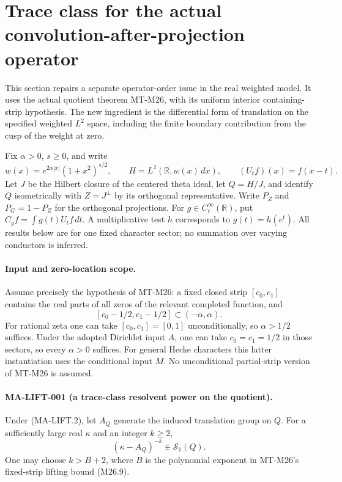 \section{Trace class for the actual convolution-after-projection operator}
\label{sec:actual-lift-trace}

This section repairs a separate operator-order issue in the real
weighted model. It uses the actual quotient theorem MT-M26, with
its uniform interior containing-strip hypothesis. The new ingredient
is the differential form of translation on the specified weighted
$L^2$ space, including the finite boundary contribution from the
cusp of the weight at zero.

Fix $\alpha>0$, $s\ge0$, and write
\[
 w(x)=e^{2\alpha|x|}(1+x^2)^{s/2},\qquad
 H=L^2(\mathbb R,w(x)\,dx),\qquad (U_tf)(x)=f(x-t).
 \tag{MA-LIFT.1}
\]
Let $J$ be the Hilbert closure of the centered theta ideal, let
$Q=H/J$, and identify $Q$ isometrically with $Z=J^\perp$ by its
orthogonal representative. Write $P_Z$ and $P_G=1-P_Z$ for the
orthogonal projections. For $g\in C_c^\infty(\mathbb R)$, put
$C_gf=\int g(t)U_tf\,dt$. A multiplicative test $h$ corresponds
to $g(t)=h(e^t)$. All results below are for one fixed character
sector; no summation over varying conductors is inferred.

\paragraph{Input and zero-location scope.}
Assume precisely the hypothesis of MT-M26: a fixed closed strip
$[c_0,c_1]$ contains the real parts of all zeros of the relevant
completed function, and
\[
 [c_0-1/2,c_1-1/2]\subset(-\alpha,\alpha).
 \tag{MA-LIFT.2}
\]
For rational zeta one can take $[c_0,c_1]=[0,1]$ unconditionally,
so $\alpha>1/2$ suffices. Under the adopted Dirichlet input $A$,
one can take $c_0=c_1=1/2$ in those sectors, so every $\alpha>0$
suffices. For general Hecke characters this latter instantiation
uses the conditional input $M$. No unconditional partial-strip
version of MT-M26 is assumed.

\paragraph{MA-LIFT-001 (a trace-class resolvent power on the quotient).}
Under (MA-LIFT.2), let $A_Q$ generate the induced translation group
on $Q$. For a sufficiently large real $\kappa$ and an integer $k\ge2$,
\[
                  (\kappa-A_Q)^{-k}\in\mathcal S_1(Q).
 \tag{MA-LIFT.3}
\]
One may choose $k>B+2$, where $B$ is the polynomial exponent in
MT-M26's fixed-strip lifting bound (M26.9).


